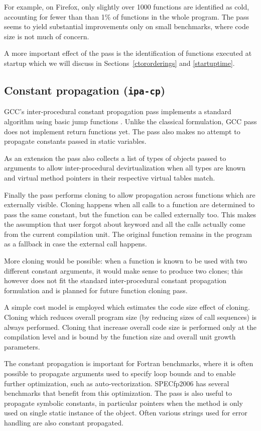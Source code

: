 \documentclass[final]{ols}
\begin{document}
For example, on Firefox, only slightly over 1000 functions are identified as cold,
accounting for fewer than than 1\% of functions in the whole program.  The pass
seems to yield substantial improvements only on small benchmarks, where code
size is not much of concern.

A more important effect of the pass is the identification of functions executed
at startup which we will discuss in Sections~\ref{ctororderings} and \ref{startuptime}.

\subsection{Constant propagation ({\tt ipa-cp})}
GCC's inter-procedural constant propagation pass \cite{ipa-cp} implements a standard algorithm using basic jump functions
\cite{IPACP}. Unlike the classical formulation, GCC pass does not implement return functions yet.
The pass also makes no attempt to propagate constants passed in static variables.

As an extension the pass also collects a list of types of objects passed to 
arguments to allow inter-procedural devirtualization when all types are known
and virtual method pointers in their respective virtual tables match.

Finally the pass performs cloning to allow propagation across functions which
are externally visible.  Cloning happens when all calls to a function are determined to pass the same
constant, but the function can be called externally too.
This makes the assumption that user forgot about  keyword and all the
calls actually come from the current compilation unit.  The original function
remains in the program as a fallback in case the external call happens.

More cloning would be possible: when a function is known to be used with two
different constant arguments, it would make sense to produce two clones;
this however does not fit the standard inter-procedural constant propagation
formulation and is planned for future function cloning pass.

A simple cost model is employed which estimates the code size effect of cloning.
Cloning which reduces overall program size (by reducing sizes of call sequences) is
always performed. Cloning that increase overall code size is performed only at
the  compilation level and is bound by the function size and overall unit
growth parameters.

The constant propagation is important for Fortran benchmarks, where it is often
possible to propagate arguments used to specify loop bounds and to enable
further optimization, such as auto-vectorization.  SPECfp2006 has several
benchmarks that benefit from this optimization.  The pass is also useful to propagate
symbolic constants, in particular  pointers when the method is only used on
single static instance of the object. Often various strings used for error
handling are also constant propagated.
\end{document}
